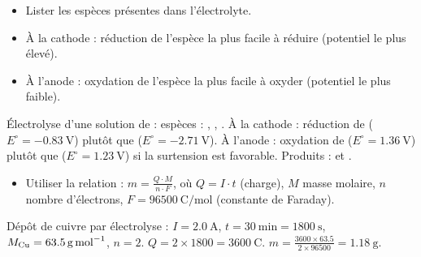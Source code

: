 \begin{itemize}
    \item Lister les espèces présentes dans l'électrolyte.
    \item À la cathode : réduction de l'espèce la plus facile à réduire (potentiel le plus élevé).
    \item À l'anode : oxydation de l'espèce la plus facile à oxyder (potentiel le plus faible).
\end{itemize}
\begin{exemple}
Électrolyse d'une solution de  : espèces : , , . À la cathode : réduction de  ($E^\circ = \SI{-0.83}{\volt}$) plutôt que  ($E^\circ = \SI{-2.71}{\volt}$). À l'anode : oxydation de  ($E^\circ = \SI{1.36}{\volt}$) plutôt que  ($E^\circ = \SI{1.23}{\volt}$) si la surtension est favorable. Produits :  et .
\end{exemple}

\begin{itemize}
    \item Utiliser la relation : $m = \frac{Q \cdot M}{n \cdot F}$, où $Q = I \cdot t$ (charge), $M$ masse molaire, $n$ nombre d'électrons, $F = \SI{96500}{\coulomb\per\mol}$ (constante de Faraday).
\end{itemize}
\begin{exemple}
Dépôt de cuivre par électrolyse : $I = \SI{2.0}{\ampere}$, $t = \SI{30}{\minute} = \SI{1800}{\second}$, $M_{\ce{Cu}} = \SI{63.5}{\gram\per\mol}$, $n = 2$. $Q = 2 \times 1800 = \SI{3600}{\coulomb}$. $m = \frac{3600 \times 63.5}{2 \times 96500} = \SI{1.18}{\gram}$.
\end{exemple}